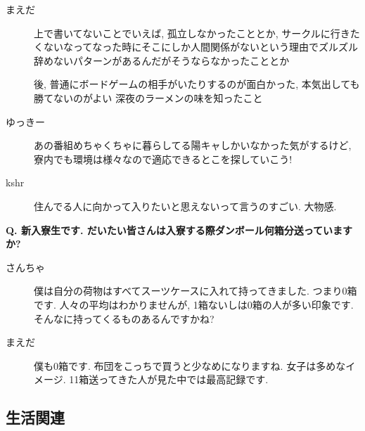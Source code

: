 \documentclass[10pt,b5jsbook,dvips,dvipdfmx,openany]{jsbook}
\theoremstyle{definition}
\begin{document}
\begin{multicols}{2}
\begin{description}
		\item[まえだ]
		上で書いてないことでいえば, 孤立しなかったこととか, サークルに行きたくないなってなった時にそこにしか人間関係がないという理由でズルズル辞めないパターンがあるんだがそうならなかったこととか

		後, 普通にボードゲームの相手がいたりするのが面白かった, 本気出しても勝てないのがよい
		深夜のラーメンの味を知ったこと

		\item[ゆっきー]
		あの番組めちゃくちゃに暮らしてる陽キャしかいなかった気がするけど, 寮内でも環境は様々なので適応できるとこを探していこう! 
		
		\item[kshr]
		住んでる人に向かって入りたいと思えないって言うのすごい. 大物感. 
		\end{description}

		\begin{tcolorbox}
		\textbf{Q. 新入寮生です. だいたい皆さんは入寮する際ダンボール何箱分送っていますか?}
		\end{tcolorbox}
		\begin{description}
		\item[さんちゃ]
		僕は自分の荷物はすべてスーツケースに入れて持ってきました. つまり0箱です. 人々の平均はわかりませんが, 1箱ないしは0箱の人が多い印象です. そんなに持ってくるものあるんですかね? 

		\item[まえだ]
		僕も0箱です. 布団をこっちで買うと少なめになりますね. 女子は多めなイメージ.  11箱送ってきた人が見た中では最高記録です. 
		\end{description}



		\end{multicols}


		\subsection{生活関連}
\end{document}
